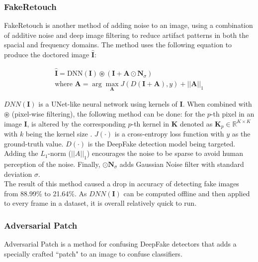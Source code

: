 \documentclass{article}
\begin{document}
\subsubsection{FakeRetouch}

FakeRetouch is another method of adding noise to an image, using a combination of additive noise and deep image filtering to reduce artifact patterns in both the spacial and frequency domains\cite{huang2020fakeretouch}. The method uses the following equation to produce the doctored image $\hat{\mathbf{I}}$:

\begin{equation}
\begin{array}{c}
    \hat{\mathbf{I}}=\text{DNN}(\mathbf{I})\circledast (\mathbf{I} +\mathbf{A}\odot \mathbf{N}_{\sigma}) \\
    \text{where }\mathbf{A}=\arg \max _{\mathbf{A}}J(D(\mathbf{I}+\mathbf{A}), y) +||\mathbf{A}||_1
\end{array}
\end{equation}

$DNN(\mathbf{I})$ is a UNet-like neural network using kernels of $\mathbf{I}$. When combined with $\circledast$ (pixel-wise filtering), the following method can be done: for the $p$-th pixel in an image $\mathbf{I}$, is altered by the corresponding $p$-th kernel in $\mathbf{K}$ denoted as $\textbf{K}_p \in \mathbb{R}^{K \times K}$ with $k$ being the kernel size \cite{huang2020fakeretouch}. $J(\cdot)$ is a cross-entropy loss function with $y$ as the ground-truth value. $D(\cdot)$ is the DeepFake detection model being targeted. Adding the $L_1$-norm ($||A||_1$) encourages the noise to be sparse to avoid human perception of the noise. Finally, $\odot \mathbf{N}_\sigma$ adds Gaussian Noise filter with standard deviation $\sigma$. \\

The result of this method caused a drop in accuracy of detecting fake images from 88.99\% to 21.64\%. As $DNN(\mathbf{I})$ can be computed offline and then applied to every frame in a dataset, it is overall relatively quick to run.

\subsubsection{Adversarial Patch}

Adversarial Patch is a method for confusing DeepFake detectors that adds a specially crafted ``patch" to an image to confuse classifiers\cite{brown2017adversarial}.
\end{document}
